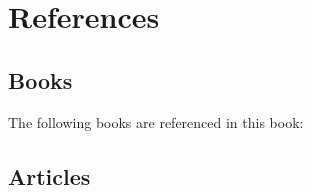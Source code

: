 \chapter{References}

\section{Books}\label{section:books}
The following books are referenced in this book:

\printbibliography[heading=bibempty,type=book]

\cite{carrier-file-systems}
\section{Articles}

